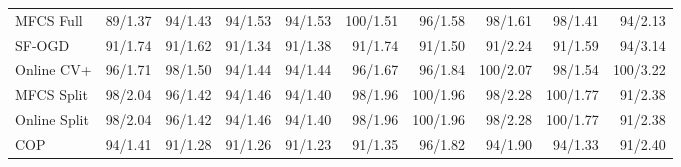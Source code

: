 \documentclass[11pt]{article}
\begin{document}
\begin{table}[h]
{\begin{tabular}{lrrrrrrrrr}
MFCS Full & 89/1.37 & 94/1.43 & 94/1.53 & 94/1.53 & 100/1.51 & 96/1.58 & 98/1.61 & 98/1.41 & 94/2.13\\
SF-OGD & 91/1.74 & 91/1.62 & 91/1.34 & 91/1.38 & 91/1.74 & 91/1.50 & 91/2.24 & 91/1.59 & 94/3.14\\
Online CV+ & 96/1.71 & 98/1.50 & 94/1.44 & 94/1.44 & 96/1.67 & 96/1.84 & 100/2.07 & 98/1.54 & 100/3.22\\
MFCS Split & 98/2.04 & 96/1.42 & 94/1.46 & 94/1.40 & 98/1.96 & 100/1.96 & 98/2.28 & 100/1.77 & 91/2.38\\
Online Split & 98/2.04 & 96/1.42 & 94/1.46 & 94/1.40 & 98/1.96 & 100/1.96 & 98/2.28 & 100/1.77 & 91/2.38\\
COP & 94/1.41 & 91/1.28 & 91/1.26 & 91/1.23 & 91/1.35 & 96/1.82 & 94/1.90 & 94/1.33 & 91/2.40\\
\bottomrule\end{tabular}}\end{table}
\end{document}
